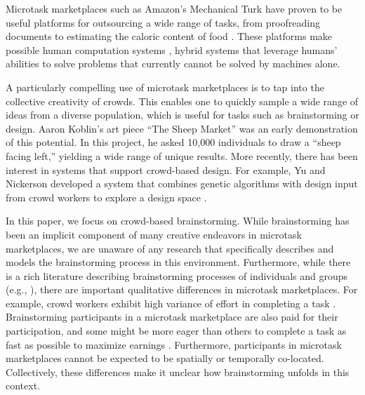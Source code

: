 
Microtask marketplaces such as Amazon's Mechanical Turk have proven to be useful platforms for outsourcing a wide range of tasks, from proofreading documents \cite{soylent} to estimating the caloric content of food \cite{platemate}.  These platforms make possible human computation systems \cite{quinn_2011}, hybrid systems that leverage humans' abilities to solve problems that currently cannot be solved by machines alone.

A particularly compelling use of microtask marketplaces is to tap into the collective creativity of crowds. This enables one to quickly sample a wide range of ideas from a diverse population, which is useful for tasks such as brainstorming or design. Aaron Koblin's art piece ``The Sheep Market'' \cite{koblin_2009} was an early demonstration of this potential. In this project, he asked 10,000 individuals to draw a ``sheep facing left,'' yielding a wide range of unique results. More recently, there has been interest in systems that support crowd-based design. For example, Yu and Nickerson developed a system that combines genetic algorithms with design input from crowd workers to explore a design space \cite{yu_cooks_2011}. 

In this paper, we focus on crowd-based brainstorming. While brainstorming has been an implicit component of many creative endeavors in microtask marketplaces, we are unaware of any research that specifically describes and models the brainstorming process in this environment. Furthermore, while there is a rich literature describing brainstorming processes of individuals and groups (e.g., \cite{osborn_applied_1957, pinsonneault_electronic_1999, nijstad_how_2006,brown1998modeling}), there are important qualitative differences in microtask marketplaces. For example, crowd workers exhibit high variance of effort in completing a task \cite{soylent}. Brainstorming participants in a microtask marketplace are also paid for their participation, and some might be more eager than others to complete a task as fast as possible to maximize earnings \cite{kittur2008crowdsourcing}. Furthermore, participants in microtask marketplaces cannot be expected to be spatially or temporally co-located. Collectively, these differences make it unclear how brainstorming unfolds in this context.

